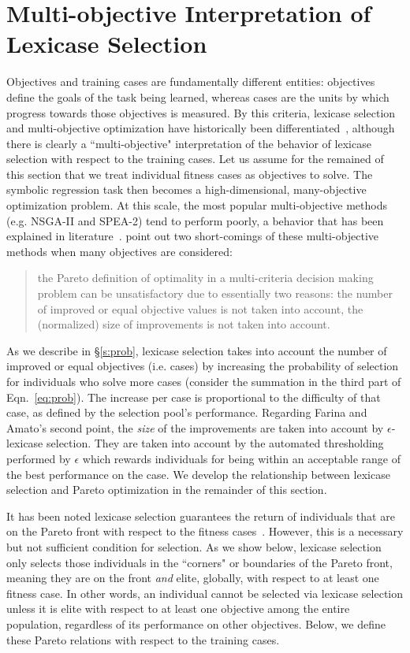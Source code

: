 \documentclass[twoside]{article}
\begin{document}
\section{Multi-objective Interpretation of Lexicase Selection}\label{s:mo}

Objectives and training cases are fundamentally different entities: objectives define the goals of the task being learned, whereas cases are the units by which progress towards those objectives is measured. By this criteria, lexicase selection and multi-objective optimization have historically been differentiated~\citep{helmuth_general_2015}, although there is clearly a ``multi-objective" interpretation of the behavior of lexicase selection with respect to the training cases. Let us assume for the remained of this section that we treat individual fitness cases as objectives to solve. The symbolic regression task then becomes a high-dimensional, many-objective optimization problem. At this scale, the most popular multi-objective methods (e.g. NSGA-II and SPEA-2) tend to perform poorly, a behavior that has been explained in literature~\citep{wagner_pareto-_2007, farina_optimal_2002}. \cite{farina_optimal_2002} point out two short-comings of these multi-objective methods when many objectives are considered: \begin{quote}
the Pareto definition of optimality in a multi-criteria decision making problem can be unsatisfactory due to essentially two reasons: the number of improved or equal objective values is not taken into account, the (normalized) size of improvements is not taken into account.
\end{quote}

As we describe in \S\ref{s:prob}, lexicase selection takes into account the number of improved or equal objectives (i.e. cases) by increasing the probability of selection for individuals who solve more cases (consider the summation in the third part of Eqn.~\ref{eq:prob}). The increase per case is proportional to the difficulty of that case, as defined by the selection pool's performance. Regarding Farina and Amato's second point, the {\it size} of the improvements are taken into account by $\epsilon$-lexicase selection. They are taken into account by the automated thresholding performed by $\epsilon$ which rewards individuals for being within an acceptable range of the best performance on the case. We develop the relationship between lexicase selection and Pareto optimization in the remainder of this section. 

It has been noted lexicase selection guarantees the return of individuals that are on the Pareto front with respect to the fitness cases~\citep{la_cava_epsilon-lexicase_2016}. However, this is a necessary but not sufficient condition for selection. As we show below, lexicase selection only selects those individuals in the ``corners" or boundaries of the Pareto front, meaning they are on the front {\it and} elite, globally, with respect to at least one fitness case. In other words, an individual cannot be selected via lexicase selection unless it is elite with respect to at least one objective among the entire population, regardless of its performance on other objectives. Below, we define these Pareto relations with respect to the training cases. 
\end{document}

